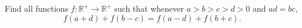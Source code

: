 Find all functions $f:\mathbb{R}^+\to\mathbb{R}^+$ such that whenever $a>b>c>d>0$ and $ad=bc$,
\[f(a+d)+f(b-c)=f(a-d)+f(b+c).\]
